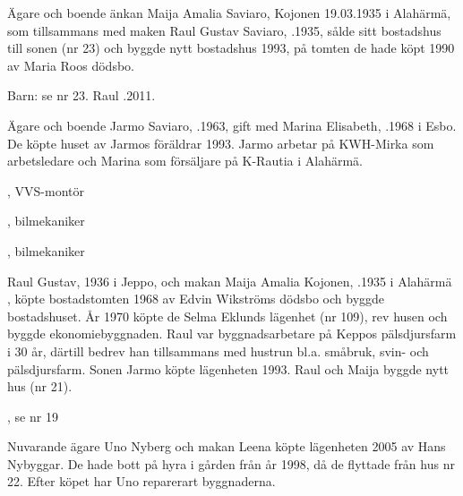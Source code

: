 
Ägare och boende änkan Maija Amalia Saviaro, \textborn Kojonen 19.03.1935 i Alahärmä, som tillsammans med maken Raul Gustav Saviaro, .1935, sålde sitt bostadshus till sonen (nr 23) och byggde nytt bostadshus 1993, på tomten de hade köpt 1990 av Maria Roos dödsbo.

Barn: se nr 23. Raul .2011.




Ägare och boende Jarmo Saviaro, .1963, gift med Marina Elisabeth, .1968 i Esbo. De köpte huset av Jarmos föräldrar 1993. Jarmo arbetar på KWH-Mirka som arbetsledare och Marina som försäljare på K-Rautia i Alahärmä.
\begin{jhchildren}
  \item {}, VVS-montör
  \item {}, bilmekaniker
  \item {}, bilmekaniker
\end{jhchildren}


Raul Gustav,  1936 i Jeppo, och makan Maija Amalia Kojonen, .1935 i Alahärmä , köpte bostadstomten 1968 av Edvin Wikströms dödsbo och byggde bostadshuset. År 1970 köpte de Selma Eklunds lägenhet (nr 109),
rev husen och byggde ekonomiebyggnaden. Raul var byggnadsarbetare på Keppos pälsdjursfarm i 30 år, därtill bedrev han  tillsammans med hustrun bl.a. småbruk, svin- och pälsdjursfarm. Sonen Jarmo köpte lägenheten 1993. Raul och Maija byggde nytt hus (nr 21).
\begin{jhchildren}
  \item {}, se nr 19
  \item {}
\end{jhchildren}




Nuvarande ägare Uno Nyberg och makan Leena köpte lägenheten 2005 av Hans Nybyggar. De hade bott på hyra i gården från år 1998, då de flyttade från hus nr 22.  Efter köpet har Uno reparerart byggnaderna.


